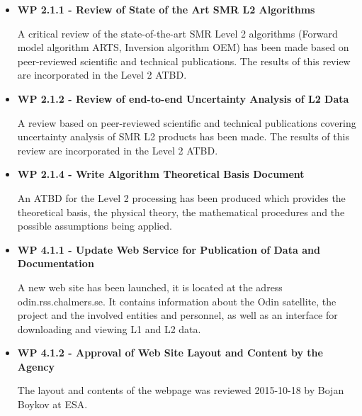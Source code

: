 \begin{itemize}
\item{\bf WP 2.1.1 - Review of State of the Art SMR L2 Algorithms}

A critical review of the state-of-the-art SMR Level 2 algorithms
(Forward model algorithm ARTS, Inversion algorithm OEM) has been made based on peer-reviewed scientific and technical publications. The results of this review are incorporated in the Level 2 ATBD.

\item{\bf WP 2.1.2 - Review of end-to-end Uncertainty Analysis of L2 Data}

 A review based on peer-reviewed scientific and technical publications covering uncertainty analysis of SMR L2 products has been made. The results of this review are incorporated in the Level 2 ATBD.

\item{\bf WP 2.1.4 - Write Algorithm Theoretical Basis Document}

An ATBD for the Level 2 processing has been produced which provides the theoretical basis, the physical theory, the mathematical procedures and the possible assumptions being applied.

\item {\bf WP 4.1.1 - Update Web Service for Publication of Data and Documentation}

A new web site has been launched, it is located at the adress odin.rss.chalmers.se. It contains information about the Odin satellite, the project and the involved entities and personnel, as well as an interface for downloading and viewing L1 and L2 data.   

\item {\bf WP 4.1.2 - Approval of Web Site Layout and Content by the Agency}

The layout and contents of the webpage was reviewed 2015-10-18 by Bojan Boykov at ESA. 

\end{itemize}


